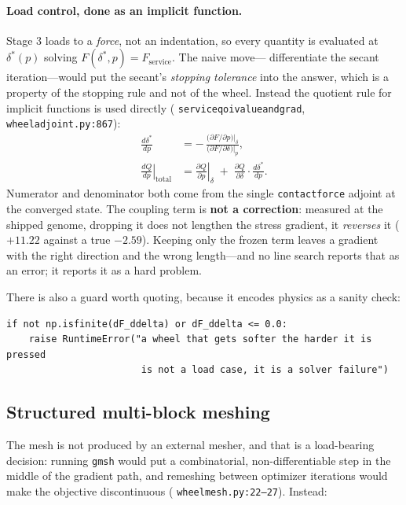 \documentclass[11pt,a4paper]{article}
\DeclareRobustCommand{\code}[1]{%
  \texttt{\small\def\_{\textunderscore\discretionary{}{}{}}#1}}
\newcommand{\at}[2]{\code{#1:#2}}
\begin{document}
\paragraph{Load control, done as an implicit function.}
Stage 3 loads to a \emph{force}, not an indentation, so every quantity is evaluated at
$\delta^*(p)$ solving $F(\delta^*, p) = F_{\text{service}}$. The naive move---%
differentiate the secant iteration---would put the secant's \emph{stopping tolerance}
into the answer, which is a property of the stopping rule and not of the wheel. Instead
the quotient rule for implicit functions is used directly
(\code{service\_qoi\_value\_and\_grad}, \at{wheel\_adjoint.py}{867}):
%
\begin{align}
  \frac{d\delta^*}{dp}
    &= -\,\frac{\bigl(\partial F/\partial p\bigr)\big|_{\delta}}
               {\bigl(\partial F/\partial \delta\bigr)\big|_{p}},
  \label{eq:implicit}\\[4pt]
  \left.\frac{dQ}{dp}\right|_{\text{total}}
    &= \left.\frac{\partial Q}{\partial p}\right|_{\delta}
       \;+\; \frac{\partial Q}{\partial \delta}\cdot\frac{d\delta^*}{dp}.
  \label{eq:coupling}
\end{align}
%
Numerator and denominator both come from the single \code{contact\_force} adjoint at
the converged state. The coupling term is \textbf{not a correction}: measured at the
shipped genome, dropping it does not lengthen the stress gradient, it \emph{reverses}
it ($+11.22$ against a true $-2.59$). Keeping only the frozen term leaves a gradient
with the right direction and the wrong length---and no line search reports that as an
error; it reports it as a hard problem.

There is also a guard worth quoting, because it encodes physics as a sanity check:

\begin{lstlisting}[style=py]
if not np.isfinite(dF_ddelta) or dF_ddelta <= 0.0:
    raise RuntimeError("a wheel that gets softer the harder it is pressed
                        is not a load case, it is a solver failure")
\end{lstlisting}

\subsection{Structured multi-block meshing}
\label{sec:meshing}

The mesh is not produced by an external mesher, and that is a load-bearing decision:
running \code{gmsh} would put a combinatorial, non-differentiable step in the middle of
the gradient path, and remeshing between optimizer iterations would make the objective
discontinuous (\at{wheel\_mesh.py}{22--27}). Instead:
\end{document}
